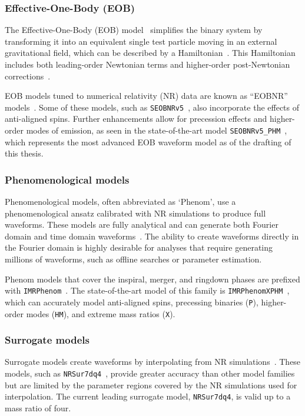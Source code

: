 \subsubsection{Effective-One-Body (EOB)}

The Effective-One-Body (EOB) model~\cite{EOB_1:1998} simplifies the binary system by transforming it into an equivalent single test particle moving in an external gravitational field, which can be described by a Hamiltonian~\cite{EOB_1:1998, EOB_2:2000, EOB_3:2000, EOB_4:2001}. This Hamiltonian includes both leading-order Newtonian terms and higher-order post-Newtonian corrections~\cite{EOB_5:2008}.

EOB models tuned to numerical relativity (NR) data are known as ``EOBNR'' models~\cite{EOB_6:2007}. Some of these models, such as \texttt{SEOBNRv5}~\cite{SEOBNRv5:2023tna}, also incorporate the effects of anti-aligned spins. Further enhancements allow for precession effects and higher-order modes of \gwadj emission, as seen in the state-of-the-art model \texttt{SEOBNRv5\_PHM}~\cite{SEOBNRv5_PHM-Buades:2023ehm}, which represents the most advanced EOB waveform model as of the drafting of this thesis.

\subsubsection{Phenomenological models}

Phenomenological models, often abbreviated as `Phenom', use a phenomenological ansatz calibrated with NR simulations to produce full waveforms. These models are fully analytical and can generate both Fourier domain and time domain waveforms~\cite{IMR_1:2007, IMR_2:2020}. The ability to create waveforms directly in the Fourier domain is highly desirable for analyses that require generating millions of waveforms, such as offline searches or parameter estimation.

Phenom models that cover the inspiral, merger, and ringdown phases are prefixed with \texttt{IMRPhenom}~\cite{IMRPhenomD:2009}. The state-of-the-art model of this family is \texttt{IMRPhenomXPHM}~\cite{IMRPhenomXPHM:2020}, which can accurately model anti-aligned spins, precessing binaries (\texttt{P}), higher-order modes (\texttt{HM}), and extreme mass ratios (\texttt{X}).

\subsubsection{Surrogate models}

Surrogate models create waveforms by interpolating from NR simulations~\cite{Surr_1:2019, Surr_2:2022}. These models, such as \texttt{NRSur7dq4}~\cite{NRSur7dq4:2019}, provide greater accuracy than other model families but are limited by the parameter regions covered by the NR simulations used for interpolation. The current leading surrogate model, \texttt{NRSur7dq4}, is valid up to a mass ratio of four.

